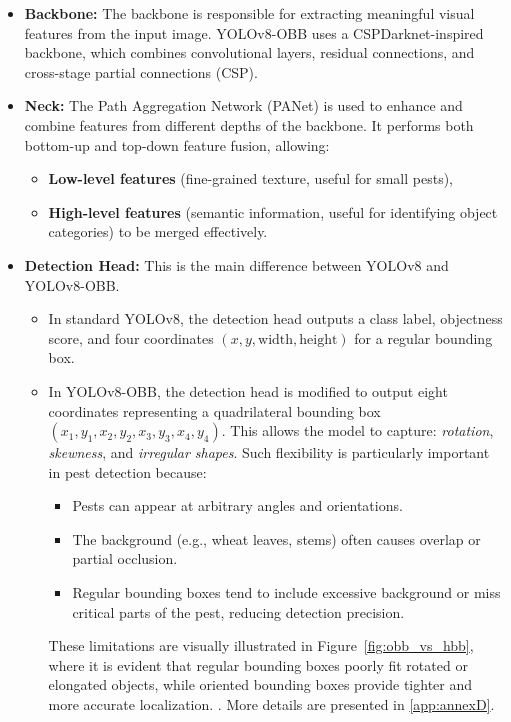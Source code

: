 \begin{itemize}
    \item \textbf{Backbone:} The backbone is responsible for extracting meaningful visual features from the input image. YOLOv8-OBB uses a CSPDarknet-inspired backbone, which combines convolutional layers, residual connections, and cross-stage partial connections (CSP).

    \item \textbf{Neck:} The Path Aggregation Network (PANet) is used to enhance and combine features from different depths of the backbone. It performs both bottom-up and top-down feature fusion, allowing:
    \begin{itemize}
        \item \textbf{Low-level features} (fine-grained texture, useful for small pests),
        \item \textbf{High-level features} (semantic information, useful for identifying object categories) to be merged effectively.
    \end{itemize}

    \item \textbf{Detection Head:} This is the main difference between YOLOv8 and YOLOv8-OBB.
    \begin{itemize}
        \item In standard YOLOv8, the detection head outputs a class label, objectness score, and four coordinates \((x, y, \text{width}, \text{height})\) for a regular bounding box.
        \item In YOLOv8-OBB, the detection head is modified to output eight coordinates representing a quadrilateral bounding box \((x_1, y_1, x_2, y_2, x_3, y_3, x_4, y_4)\). This allows the model to capture: \textit{rotation}, \textit{skewness}, and \textit{irregular shapes}. Such flexibility is particularly important in pest detection because:
        \begin{itemize}
            \item Pests can appear at arbitrary angles and orientations.
            \item The background (e.g., wheat leaves, stems) often causes overlap or partial occlusion.
            \item Regular bounding boxes tend to include excessive background or miss critical parts of the pest, reducing detection precision.
        \end{itemize}
        These limitations are visually illustrated in Figure~\ref{fig:obb_vs_hbb}, where it is evident that regular bounding boxes poorly fit rotated or elongated objects, while oriented bounding boxes provide tighter and more accurate localization. \parencite{ultralytics2024obb}. More details are presented in \ref{app:annexD}.
    \end{itemize}
\end{itemize}

